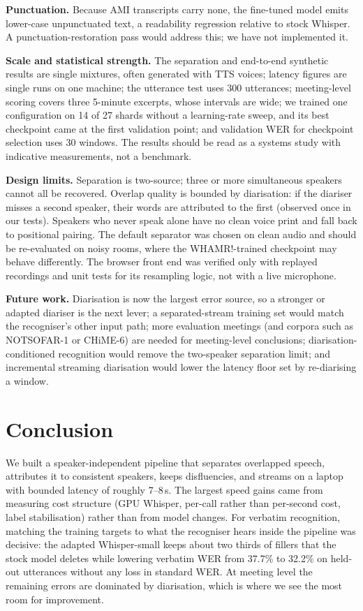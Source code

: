 \documentclass[conference]{IEEEtran}
\begin{document}
\textbf{Punctuation.} Because AMI transcripts carry none, the fine-tuned model emits lower-case unpunctuated text, a readability regression relative to stock Whisper. A punctuation-restoration pass would address this; we have not implemented it.

\textbf{Scale and statistical strength.} The separation and end-to-end synthetic results are single mixtures, often generated with TTS voices; latency figures are single runs on one machine; the utterance test uses 300 utterances; meeting-level scoring covers three 5-minute excerpts, whose intervals are wide; we trained one configuration on 14 of 27 shards without a learning-rate sweep, and its best checkpoint came at the first validation point; and validation WER for checkpoint selection uses 30 windows. The results should be read as a systems study with indicative measurements, not a benchmark.

\textbf{Design limits.} Separation is two-source; three or more simultaneous speakers cannot all be recovered. Overlap quality is bounded by diarisation: if the diariser misses a second speaker, their words are attributed to the first (observed once in our tests). Speakers who never speak alone have no clean voice print and fall back to positional pairing. The default separator was chosen on clean audio and should be re-evaluated on noisy rooms, where the WHAMR!-trained checkpoint may behave differently. The browser front end was verified only with replayed recordings and unit tests for its resampling logic, not with a live microphone.

\textbf{Future work.} Diarisation is now the largest error source, so a stronger or adapted diariser is the next lever; a separated-stream training set would match the recogniser's other input path; more evaluation meetings (and corpora such as NOTSOFAR-1 or CHiME-6) are needed for meeting-level conclusions; diarisation-conditioned recognition would remove the two-speaker separation limit; and incremental streaming diarisation would lower the latency floor set by re-diarising a window.

\section{Conclusion}
We built a speaker-independent pipeline that separates overlapped speech, attributes it to consistent speakers, keeps disfluencies, and streams on a laptop with bounded latency of roughly 7--8\,s. The largest speed gains came from measuring cost structure (GPU Whisper, per-call rather than per-second cost, label stabilisation) rather than from model changes. For verbatim recognition, matching the training targets to what the recogniser hears inside the pipeline was decisive: the adapted Whisper-small keeps about two thirds of fillers that the stock model deletes while lowering verbatim WER from 37.7\% to 32.2\% on held-out utterances without any loss in standard WER. At meeting level the remaining errors are dominated by diarisation, which is where we see the most room for improvement.
\end{document}

